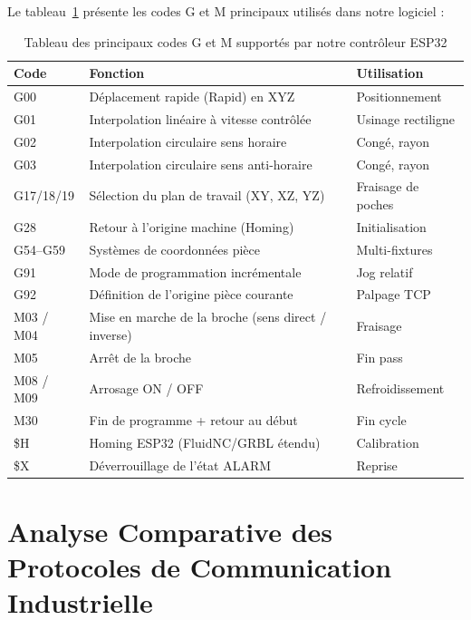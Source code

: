 Le tableau~\ref{tab:gcode_5axes} présente les codes G et M principaux utilisés dans notre logiciel :

\begin{table}[htbp]
\centering
\renewcommand{\arraystretch}{1.3}
\begin{tabular}{|l|p{6cm}|l|}
\hline
\rowcolor{macouleur!20}
\textbf{Code} & \textbf{Fonction} & \textbf{Utilisation} \\
\hline
G00 & Déplacement rapide (Rapid) en XYZ & Positionnement \\
\hline
G01 & Interpolation linéaire à vitesse contrôlée & Usinage rectiligne \\
\hline
G02 & Interpolation circulaire sens horaire & Congé, rayon \\
\hline
G03 & Interpolation circulaire sens anti-horaire & Congé, rayon \\
\hline
G17/18/19 & Sélection du plan de travail (XY, XZ, YZ) & Fraisage de poches \\
\hline
G28 & Retour à l'origine machine (Homing) & Initialisation \\
\hline
G54--G59 & Systèmes de coordonnées pièce & Multi-fixtures \\
\hline
G91 & Mode de programmation incrémentale & Jog relatif \\
\hline
G92 & Définition de l'origine pièce courante & Palpage TCP \\
\hline
M03 / M04 & Mise en marche de la broche (sens direct / inverse) & Fraisage \\
\hline
M05 & Arrêt de la broche & Fin pass \\
\hline
M08 / M09 & Arrosage ON / OFF & Refroidissement \\
\hline
M30 & Fin de programme + retour au début & Fin cycle \\
\hline
\$H & Homing ESP32 (FluidNC/GRBL étendu) & Calibration \\
\hline
\$X & Déverrouillage de l'état ALARM & Reprise \\
\hline
\end{tabular}
\caption{Tableau des principaux codes G et M supportés par notre contrôleur ESP32}
\label{tab:gcode_5axes}
\end{table}

\section{Analyse Comparative des Protocoles de Communication Industrielle}

